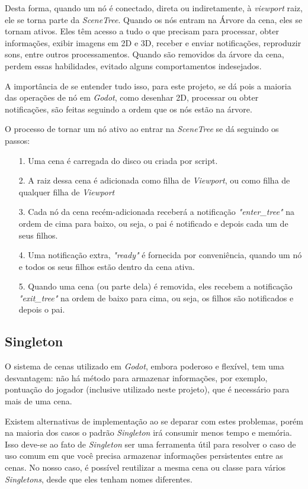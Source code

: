 Desta forma, quando um nó é conectado, direta ou indiretamente, à 
\textit{viewport} raiz, ele se torna parte da \textit{SceneTree}. Quando os nós 
entram na Árvore da cena, eles se tornam ativos. Eles têm acesso a tudo o que 
precisam para processar, obter informações, exibir imagens em 2D e 3D, receber 
e enviar notificações, reproduzir sons, entre outros processamentos. Quando são
removidos da árvore da cena, perdem essas habilidades, evitado alguns 
comportamentos indesejados.

A importância de se entender tudo isso, para este projeto, se dá pois a maioria
das operações de nó em \textit{Godot}, como desenhar 2D, processar ou obter 
notificações, são feitas seguindo a ordem que os nós estão na árvore.

O processo de tornar um nó ativo ao entrar na \textit{SceneTree} se dá seguindo
os passos:
\begin{itemize}
    \item[1.]
        Uma cena é carregada do disco ou criada por script.
    \item[2.]
        A raiz dessa cena é adicionada como filha de \textit{Viewport}, ou como 
        filha de qualquer filha de \textit{Viewport}
    \item[3.]
        Cada nó da cena recém-adicionada receberá a notificação 
        \textit{"enter\_tree"} na ordem de cima para baixo, ou seja, o pai é
        notificado e depois cada um de seus filhos.
    \item[4.]
        Uma notificação extra, \textit{"ready"} é fornecida por conveniência, 
        quando um nó e todos os seus filhos estão dentro da cena ativa.
    \item[5.]
        Quando uma cena (ou parte dela) é removida, eles recebem a notificação
        \textit{"exit\_tree"} na ordem de baixo para cima, ou seja, os filhos são
        notificados e depois o pai.
\end{itemize}

\subsection{Singleton}

O sistema de cenas utilizado em \textit{Godot}, embora poderoso e flexível, tem 
uma desvantagem: não há método para armazenar informações, por exemplo, 
pontuação do jogador (inclusive utilizado neste projeto), que é necessário para 
mais de uma cena.

Existem alternativas de implementação ao se deparar com estes problemas, porém
na maioria dos casos o padrão \textit{Singleton} irá consumir menos tempo e
memória. Isso deve-se ao fato de \textit{Singleton} ser uma ferramenta útil para
resolver o caso de uso comum em que você precisa armazenar informações 
persistentes entre as cenas. No nosso caso, é possível reutilizar a mesma cena 
ou classe para vários \textit{Singletons}, desde que eles tenham 
nomes diferentes.

